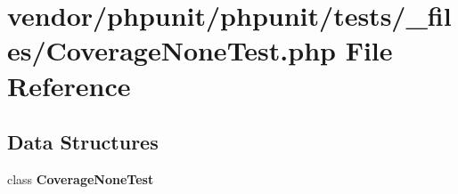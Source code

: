 \section{vendor/phpunit/phpunit/tests/\+\_\+files/\+Coverage\+None\+Test.php File Reference}
\label{phpunit_2tests_2__files_2_coverage_none_test_8php}
\subsection*{Data Structures}
\begin{DoxyCompactItemize}
\item 
class {\bf Coverage\+None\+Test}
\end{DoxyCompactItemize}
